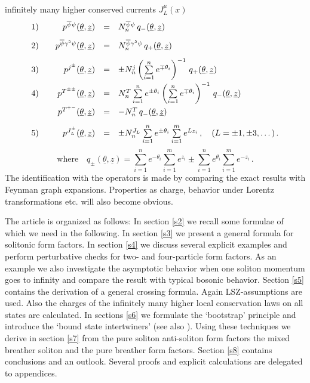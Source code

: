 \documentclass[a4paper,a4paper]{article}
\begin{document}
infinitely many higher conserved currents $J_{L}^{\mu }(x)$ 
\begin{equation}
\begin{array}{llrcl}
1) &  & p^{\overline{\psi }\psi }(\underline{\theta },\underline{z}) & = & 
N_{n}^{\overline{\psi }\psi }\,q_{-}(\underline{\theta },\underline{z}) \\%
[3mm] 
2) &  & p^{\overline{\psi }\gamma ^{5}\psi }(\underline{\theta },\underline{z%
}) & = & N_{n}^{\overline{\psi }\gamma ^{5}\psi }\,q_{+}(\underline{\theta },%
\underline{z}) \\[3mm] 
3) &  & p^{j^{\pm }}(\underline{\theta },\underline{z}) & = & \pm
N_{n}^{j}\left( \sum\limits_{i=1}^{n}e^{\mp \theta _{i}}\right) ^{-1}\,q_{+}(%
\underline{\theta },\underline{z}) \\[3mm] 
4) &  & p^{T^{\pm \pm }}(\underline{\theta },\underline{z}) & = & 
N_{n}^{T}\sum\limits_{i=1}^{n}e^{\pm \theta _{i}}\left(
\sum\limits_{i=1}^{n}e^{\mp \theta _{i}}\right) ^{-1}\,q_{-}(\underline{%
\theta },\underline{z}) \\[3mm] 
&  & p^{T^{+-}}(\underline{\theta },\underline{z}) & = & -N_{n}^{T}\,q_{-}(%
\underline{\theta },\underline{z}) \\[3mm] 
5) &  & p^{J_{L}^{\pm }}(\underline{\theta },\underline{z}) & = & \pm
N_{n}^{J_{L}}\sum\limits_{i=1}^{n}e^{\pm \theta
_{i}}\sum\limits_{i=1}^{m}e^{Lz_{i}}\,,\quad (L=\pm 1,\pm 3,\dots )\,.
\end{array}
\label{4.3}
\end{equation}
\[
\text{where}\quad q_{\pm }(\underline{\theta },\underline{z}%
)=\sum\limits_{i=1}^{n}e^{-\theta _{i}}\sum\limits_{i=1}^{m}e^{z_{i}}\pm
\sum\limits_{i=1}^{n}e^{\theta _{i}}\sum\limits_{i=1}^{m}e^{-z_{i}}\,. 
\]
The identification with the operators is made by comparing the exact results
with Feynman graph expansions. Properties as charge, behavior under Lorentz
transformations etc. will also become obvious.

The article is organized as follows: In section \ref{s2} we recall some
formulae of \cite{BFKZ} which we need in the following. In section \ref{s3}
we present a general formula for solitonic form factors. In section \ref{s4}
we discuss several explicit examples and perform perturbative checks for
two- and four-particle form factors. As an example we also investigate the
asymptotic behavior when one soliton momentum goes to infinity and compare
the result with typical bosonic behavior. Section \ref{s5} contains the
derivation of a general crossing formula. Again LSZ-assumptions are used.
Also the charges of the infinitely many higher local conservation laws on
all states are calculated. In sections \ref{s6} we formulate the `bootstrap'
principle and introduce the `bound state intertwiners' (see also \cite{Q}).
Using these techniques we derive in section \ref{s7} from the pure soliton
anti-soliton form factors the mixed breather soliton and the pure breather
form factors. Section \ref{s8} contains conclusions and an outlook. Several
proofs and explicit calculations are delegated to appendices.
\end{document}
